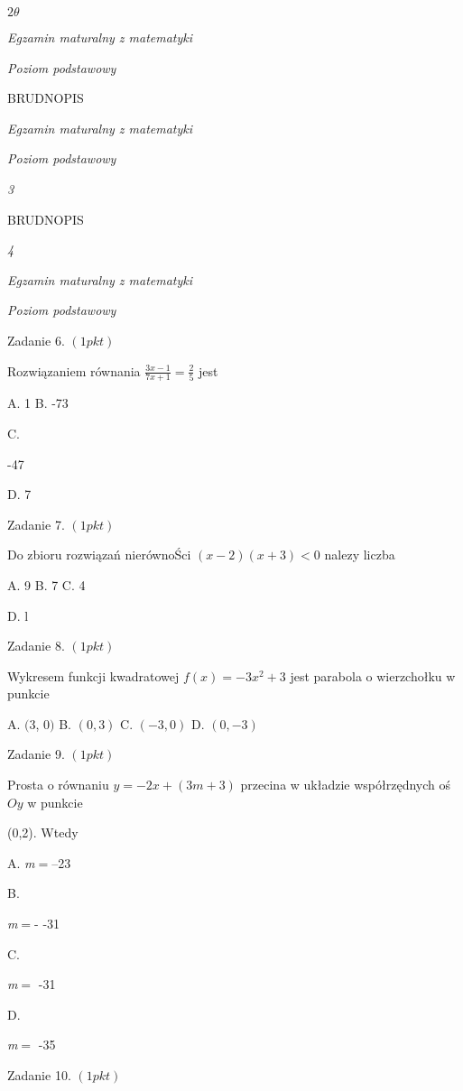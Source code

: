 \documentclass[a4paper,12pt]{article}
\begin{document}
$ 2\theta$

{\it Egzamin maturalny z matematyki}

{\it Poziom podstawowy}

BRUDNOPIS





{\it Egzamin maturalny z matematyki}

{\it Poziom podstawowy}

{\it 3}

BRUDNOPIS





{\it 4}

{\it Egzamin maturalny z matematyki}

{\it Poziom podstawowy}

Zadanie 6. $(1pkt)$

Rozwiązaniem równania $\displaystyle \frac{3x-1}{7x+1}=\frac{2}{5}$ jest

A. 1 B. -73

C.

-47

D. 7

Zadanie 7. $(1pkt)$

Do zbioru rozwiązań nierównoŚci $(x-2)(x+3)<0$ nalezy liczba

A. 9 B. 7 C. 4

D. l

Zadanie 8. $(1pkt)$

Wykresem funkcji kwadratowej $f(x)=-3x^{2}+3$ jest parabola o wierzchołku w punkcie

A. $($3, $0)$ B. $(0,3)$ C. $(-3,0)$ D. $(0,-3)$

Zadanie 9. $(1pkt)$

Prosta o równaniu $y=-2x+(3m+3)$ przecina w układzie współrzędnych oś $Oy$ w punkcie

(0,2). Wtedy

A. {\it m}$=$--23

B.

{\it m}$=$- -31

C.

{\it m}$=$ -31

D.

{\it m}$=$ -35

Zadanie 10. $(1pkt)$
\end{document}
